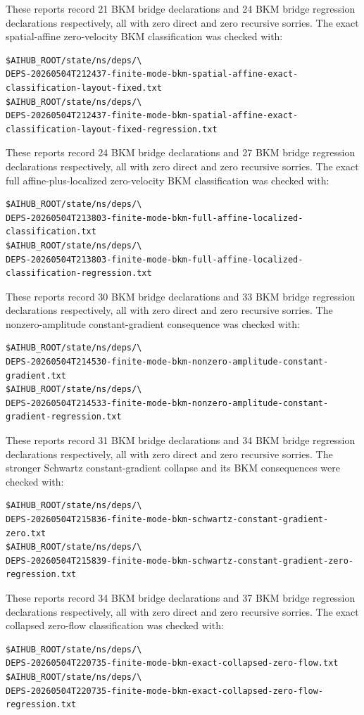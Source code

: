 \documentclass[11pt]{article}
\begin{document}
These reports record 21 BKM bridge declarations and 24 BKM bridge regression
declarations respectively, all with zero direct and zero recursive sorries.
The exact spatial-affine zero-velocity BKM classification was checked with:
\begin{verbatim}
$AIHUB_ROOT/state/ns/deps/\
DEPS-20260504T212437-finite-mode-bkm-spatial-affine-exact-classification-layout-fixed.txt
$AIHUB_ROOT/state/ns/deps/\
DEPS-20260504T212437-finite-mode-bkm-spatial-affine-exact-classification-layout-fixed-regression.txt
\end{verbatim}
These reports record 24 BKM bridge declarations and 27 BKM bridge regression
declarations respectively, all with zero direct and zero recursive sorries.
The exact full affine-plus-localized zero-velocity BKM classification was
checked with:
\begin{verbatim}
$AIHUB_ROOT/state/ns/deps/\
DEPS-20260504T213803-finite-mode-bkm-full-affine-localized-classification.txt
$AIHUB_ROOT/state/ns/deps/\
DEPS-20260504T213803-finite-mode-bkm-full-affine-localized-classification-regression.txt
\end{verbatim}
These reports record 30 BKM bridge declarations and 33 BKM bridge regression
declarations respectively, all with zero direct and zero recursive sorries.
The nonzero-amplitude constant-gradient consequence was checked with:
\begin{verbatim}
$AIHUB_ROOT/state/ns/deps/\
DEPS-20260504T214530-finite-mode-bkm-nonzero-amplitude-constant-gradient.txt
$AIHUB_ROOT/state/ns/deps/\
DEPS-20260504T214533-finite-mode-bkm-nonzero-amplitude-constant-gradient-regression.txt
\end{verbatim}
These reports record 31 BKM bridge declarations and 34 BKM bridge regression
declarations respectively, all with zero direct and zero recursive sorries.
The stronger Schwartz constant-gradient collapse and its BKM consequences were
checked with:
\begin{verbatim}
$AIHUB_ROOT/state/ns/deps/\
DEPS-20260504T215836-finite-mode-bkm-schwartz-constant-gradient-zero.txt
$AIHUB_ROOT/state/ns/deps/\
DEPS-20260504T215839-finite-mode-bkm-schwartz-constant-gradient-zero-regression.txt
\end{verbatim}
These reports record 34 BKM bridge declarations and 37 BKM bridge regression
declarations respectively, all with zero direct and zero recursive sorries.
The exact collapsed zero-flow classification was checked with:
\begin{verbatim}
$AIHUB_ROOT/state/ns/deps/\
DEPS-20260504T220735-finite-mode-bkm-exact-collapsed-zero-flow.txt
$AIHUB_ROOT/state/ns/deps/\
DEPS-20260504T220735-finite-mode-bkm-exact-collapsed-zero-flow-regression.txt
\end{verbatim}
\end{document}
